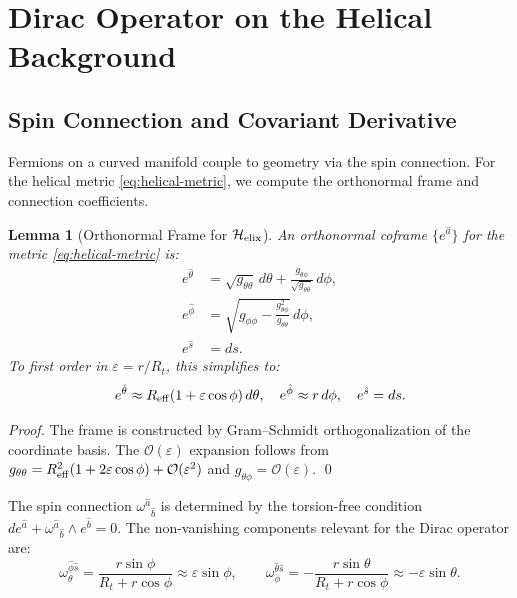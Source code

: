 \documentclass[12pt, a4paper]{article}
\newtheorem{lemma}[theorem]{Lemma}
\theoremstyle{definition}
\newcommand{\cO}{\mathcal{O}}
\newcommand{\eps}{\varepsilon}
\newcommand{\Hel}{\mathcal{H}_{\rm elix}}
\begin{document}
\section{Dirac Operator on the Helical Background}
\label{sec:dirac}

\subsection{Spin Connection and Covariant Derivative}
Fermions on a curved manifold couple to geometry via the spin connection. For the helical metric \eqref{eq:helical-metric}, we compute the orthonormal frame and connection coefficients.

\begin{lemma}[Orthonormal Frame for $\Hel$]
An orthonormal coframe $\{e^{\hat a}\}$ for the metric \eqref{eq:helical-metric} is:
\begin{equation}
\begin{aligned}
e^{\hat\theta} &= \sqrt{g_{\theta\theta}}\, d\theta + \frac{g_{\theta\phi}}{\sqrt{g_{\theta\theta}}}\, d\phi, \\
e^{\hat\phi} &= \sqrt{g_{\phi\phi} - \frac{g_{\theta\phi}^2}{g_{\theta\theta}}}\, d\phi, \\
e^{\hat s} &= ds.
\end{aligned}
\end{equation}
To first order in $\eps = r/R_t$, this simplifies to:
\begin{equation}
e^{\hat\theta} \approx R_{\rm eff}(1 + \eps\cos\phi)\, d\theta, \quad e^{\hat\phi} \approx r\, d\phi, \quad e^{\hat s} = ds.
\end{equation}
\end{lemma}

\begin{proof}
The frame is constructed by Gram--Schmidt orthogonalization of the coordinate basis. The $\cO(\eps)$ expansion follows from $g_{\theta\theta} = R_{\rm eff}^2(1+2\eps\cos\phi) + \cO(\eps^2)$ and $g_{\theta\phi} = \cO(\eps)$. \qed
\end{proof}

The spin connection $\omega^{\hat a}{}_{\hat b}$ is determined by the torsion-free condition $de^{\hat a} + \omega^{\hat a}{}_{\hat b} \wedge e^{\hat b} = 0$. The non-vanishing components relevant for the Dirac operator are:
\begin{equation}
\omega_{\theta}^{\hat\phi\hat s} = \frac{r\sin\phi}{R_t + r\cos\phi} \approx \eps\sin\phi, \qquad
\omega_{\phi}^{\hat\theta\hat s} = -\frac{r\sin\theta}{R_t + r\cos\phi} \approx -\eps\sin\theta.
\label{eq:spin-connection}
\end{equation}
\end{document}
